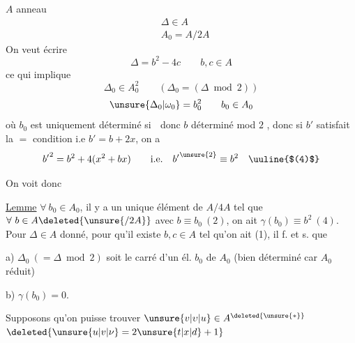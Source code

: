 $A$ anneau
\[
\begin{aligned}
&\Delta\in A\\
&A_0=A/2A
\end{aligned}
\]
On veut écrire
\[
\Delta=b^2-4c\qquad b,c\in A \tag*{(1)}
\]
ce qui implique
\[
\Delta_0\in A_0^2\qquad(\Delta_0=(\Delta\bmod2))
\]
\[
\unsure{\Delta_0|\omega_0}=b_0^2\qquad b_0\in A_0
\]
où $b_0$ est uniquement déterminé si \textcircled{\scriptsize{}} donc  $b$ déterminé mod $2$ , donc si $b'$ satisfait la $=$ condition i.e $b'=b+2x$, on a
\[
{b'}^2=b^2+4(x^2+bx)\qquad\text{i.e.}\quad {b'}^{\unsure{2}}\equiv b^2\quad\text{\uuline{$(4)$}}
\]

On voit donc

\uline{Lemme} \quad $\forall\ b_0\in A_0$, il y a un unique élément  de $A/4A$ tel que $\forall\ b\in A\deleted{\unsure{/2A}}$ avec $b\equiv b_0\ (2)$, on ait $\gamma(b_0)\equiv b^2\ (4)$. Pour $\Delta\in A$ donné, pour qu'il existe $b,c\in A$ tel qu'on ait (1), il f. et s. que

a) $\Delta_0\ (= \Delta\bmod2)$ soit le carré d'un él. $b_0$ de $A_0$ (bien déterminé car $A_0$ réduit)

b) $\gamma(b_0)=0$.

Supposons qu'on puisse trouver  $\unsure{v|\upsilon|u}\in A^{\deleted{\unsure{*}}}$  $\deleted{\unsure{u|v|\nu}=2\unsure{t|x|d}+1}$ 
